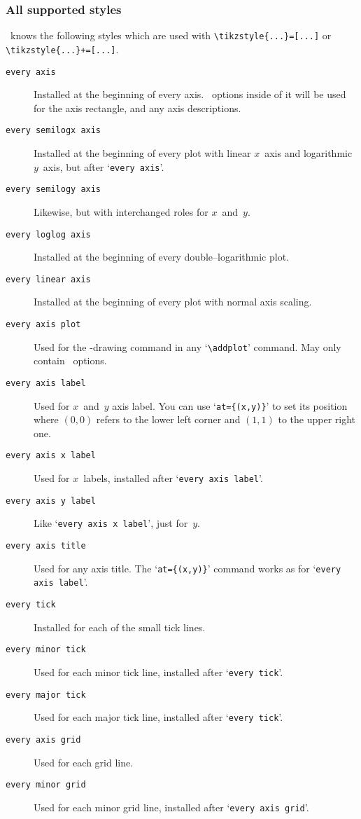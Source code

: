 \subsubsection{All supported styles}
\PGFPlots\ knows the following styles which are used with \lstinline!\tikzstyle{...}=[...]! or \lstinline!\tikzstyle{...}+=[...]!.
\label{sec:styles}%
\begin{description}
\item[\texttt{every axis}] Installed at the beginning of every axis. \Tikz\ options inside of it will be used for the axis rectangle, and any axis descriptions.
\item[\texttt{every semilogx axis}] Installed at the beginning of every plot with linear $x$~axis and logarithmic $y$~axis, but after `\texttt{every axis}'.
\item[\texttt{every semilogy axis}] Likewise, but with interchanged roles for $x$~and~$y$.
\item[\texttt{every loglog axis}] Installed at the beginning of every double--logarithmic plot.
\item[\texttt{every linear axis}] Installed at the beginning of every plot with normal axis scaling.
\item[\texttt{every axis plot}] Used for the \Tikz-drawing command in any `\lstinline!\addplot!' command. May only contain \Tikz\ options.
\item[\texttt{every axis label}] Used for $x$~and~$y$ axis label. You can use `\texttt{at=\{(x,y)\}}' to set its position where $(0,0)$ refers to the lower left corner and $(1,1)$ to the upper right one.
\item[\texttt{every axis x label}] Used for $x$~labels, installed after `\texttt{every axis label}'.
\item[\texttt{every axis y label}] Like `\texttt{every axis x label}', just for~$y$.
\item[\texttt{every axis title}] Used for any axis title. The `\texttt{at=\{(x,y)\}}' command works as for `\texttt{every axis label}'.
\item[\texttt{every tick}] Installed for each of the small tick lines.
\item[\texttt{every minor tick}] Used for each minor tick line, installed after `\texttt{every tick}'.
\item[\texttt{every major tick}] Used for each major tick line, installed after `\texttt{every tick}'.
\item[\texttt{every axis grid}] Used for each grid line.
\item[\texttt{every minor grid}] Used for each minor grid line, installed after `\texttt{every axis grid}'.

\end{description}
